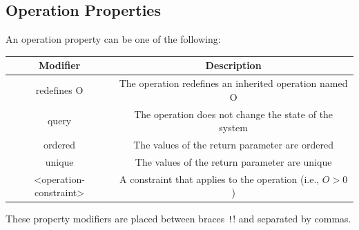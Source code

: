 \documentclass{article}
\begin{document}
\subsection{Operation Properties}
An operation property can be one of the following:
\begin{table}[H]
    \centering
    \begin{tabular}{c c}
        \toprule
        \textbf{Modifier}      & \textbf{Description}                                       \\
        \midrule
        redefines O            & The operation redefines an inherited operation named O     \\
        query                  & The operation does not change the state of the system      \\
        ordered                & The values of the return parameter are ordered             \\
        unique                 & The values of the return parameter are unique              \\
        <operation-constraint> & A constraint that applies to the operation (i.e., \(O>0\)) \\
        \bottomrule
    \end{tabular}
\end{table}
These property modifiers are placed between braces \texttt!{}! and separated by commas.
\end{document}

